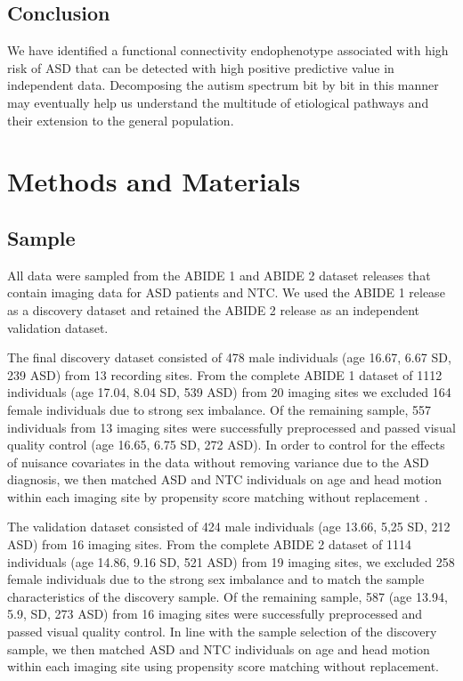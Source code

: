 \documentclass[9pt,lineno]{elife}
\begin{document}
\subsection{Conclusion}
We have identified a functional connectivity endophenotype associated with high risk of ASD that can be detected with high positive predictive value in independent data. Decomposing the autism spectrum bit by bit in this manner may eventually help us understand the multitude of etiological pathways and their extension to the general population.

\section{Methods and Materials}
\subsection{Sample}
All data were sampled from the ABIDE 1 \citep{Di_Martino2014-po} and ABIDE 2 \citep{Di_Martino2017-md} dataset releases that contain imaging data for ASD patients and NTC. We used the ABIDE 1 release as a discovery dataset and retained the ABIDE 2 release as an independent validation dataset.

The final discovery dataset consisted of 478 male individuals (age 16.67, 6.67 SD, 239 ASD) from 13 recording sites. From the complete ABIDE 1 dataset of 1112 individuals (age 17.04, 8.04 SD, 539 ASD) from 20 imaging sites we excluded 164 female individuals due to strong sex imbalance. Of the remaining sample, 557 individuals from 13 imaging sites were successfully preprocessed and passed visual quality control (age 16.65, 6.75 SD, 272 ASD). In order to control for the effects of nuisance covariates in the data without removing variance due to the ASD diagnosis, we then matched ASD and NTC individuals on age and head motion within each imaging site by propensity score matching without replacement \citep{Rosenbaum1985-ib}. 

The validation dataset consisted of 424 male individuals (age 13.66, 5,25 SD, 212 ASD) from 16 imaging sites. From the complete ABIDE 2 dataset of 1114 individuals (age 14.86, 9.16 SD, 521 ASD) from 19 imaging sites, we excluded 258 female individuals due to the strong sex imbalance and to match the sample characteristics of the discovery sample. Of the remaining sample, 587 (age 13.94, 5.9, SD, 273 ASD) from 16 imaging sites were successfully preprocessed and passed visual quality control. In line with the sample selection of the discovery sample, we then matched ASD and NTC individuals on age and head motion within each imaging site using propensity score matching without replacement.
\end{document}
